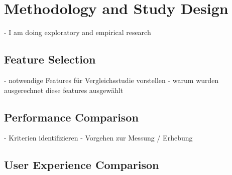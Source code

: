 \chapter{Methodology and Study Design}
- I am doing exploratory and empirical research

\section{Feature Selection} \label{section::feature_selection}
- notwendige Features für Vergleichsstudie vorstellen
- warum wurden ausgerechnet diese features ausgewählt

\section{Performance Comparison} \label{section::performance_comparison_design}
- Kriterien identifizieren 
- Vorgehen zur Messung / Erhebung


\section{User Experience Comparison}
